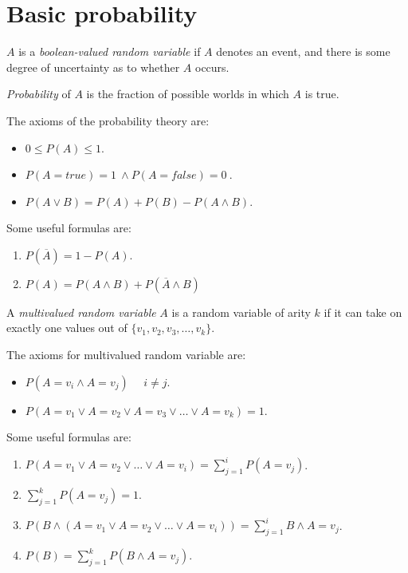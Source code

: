 \documentclass[12pt, a4paper]{report}
\newtheorem[style=M,bodystyle=\normalfont]{theorem}{Theorem}
\newtheorem[style=M,bodystyle=\normalfont]{corollary}{Corollary}
\newtheorem[style=M,bodystyle=\normalfont]{lemma}{Lemma}
\newtheorem[style=M,bodystyle=\normalfont]{definition}{Definition}
\begin{document}
    \section{Basic probability}
    \begin{definition}
        $A$ is a \emph{boolean-valued random variable} if $A$ denotes an event, and there is some degree of uncertainty as to whether $A$ occurs.

        \emph{Probability} of $A$ is the fraction of possible worlds in which $A$ is true. 
    \end{definition}
    \begin{theorem}
        The axioms of the probability theory are: 
        \begin{itemize}
            \item $0 \leq P(A) \leq 1$. 
            \item $P(A=true) = 1 \: \land P(A=false) = 0\: $. 
            \item $P(A \lor B)=P(A)+P(B)-P(A \land B)$.
        \end{itemize}
    \end{theorem}
    Some useful formulas are: 
    \begin{enumerate}
        \item $P(\overline{A})=1-P(A)$.
        \item $P(A)=P(A \land B)+P(\overline{A} \land B)$
    \end{enumerate}
    \begin{definition}
        A \emph{multivalued random variable} $A$ is a random variable of arity $k$ if it can take on exactly one values out of $\{v_1,v_2,v_3,\dots,v_k\}$.
    \end{definition}
    \begin{theorem}
        The axioms for multivalued random variable are: 
        \begin{itemize}
            \item $P(A=v_i \land A=v_j) \:\:\:\:\:\: i \neq j$. 
            \item $P(A=v_1 \lor A=v_2 \lor A=v_3 \lor \dots \lor A=v_k)=1$. 
        \end{itemize}
    \end{theorem}
    Some useful formulas are: 
    \begin{enumerate}
        \item $P(A=v_1 \lor A=v_2 \lor \dots \lor A=v_i)=\sum_{j=1}^{i}{P(A=v_j)}$.
        \item $\sum_{j=1}^{k}{P(A=v_j)}=1$. 
        \item $P(B \land (A=v_1 \lor A=v_2 \lor \dots \lor A=v_i))=\sum_{j=1}^{i}{B \land A=v_j}$. 
        \item $P(B)=\sum_{j=1}^{k}{P(B \land A=v_j)}$.
    \end{enumerate}
\end{document}
